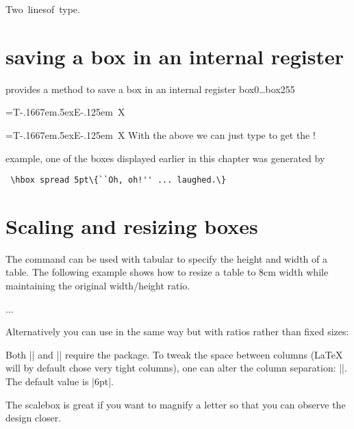 {\vbox{\hbox{Two lines}\hbox{of type.}}

\section{saving a box in an internal register}
\tex provides a method to save a box in an internal register box0\ldots box255

\begin{teX}
=\hbox{T\kern-.1667em\lower.5ex\hbox{E}\kern-.125em X}
\end{teX}

=\hbox{T\kern-.1667em\lower.5ex\hbox{E}\kern-.125em X}
With the above we can just type  to get the  !


example, one of the boxes displayed earlier in this chapter was generated by

\medskip
\verb+ \hbox spread 5pt\{``Oh, oh!'' ... laughed.\}+
\medskip

\section*{Scaling and resizing boxes}

The command  can be used with tabular to specify the height and width of a table. The following example shows how to resize a table to 8cm width while maintaining the original width/height ratio.

\begin{teX}
\resizebox{8cm}{!} {
  \begin{tabular}...
  \end{tabular}
}
\end{teX}

Alternatively you can use  in the same way but with ratios rather than fixed sizes:

\begin{teX}
\scalebox{0.7}{
  \begin{tabular}...
  \end{tabular}
}
\end{teX}

Both |\resizebox| and |\scalebox| require the  package.
To tweak the space between columns (LaTeX will by default chose very tight columns), one can alter the column separation: |\setlength{\tabcolsep}{5pt}|. The default value is |6pt|.

The scalebox is great if you want to magnify a letter so that you can observe the design closer.

}
